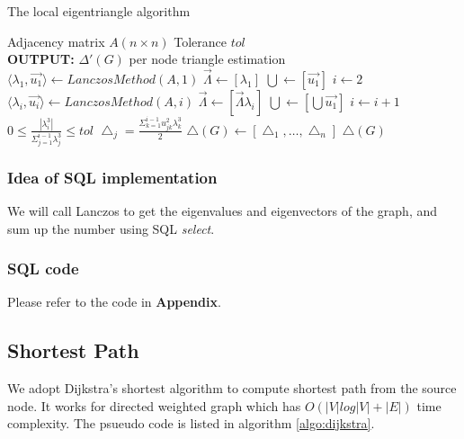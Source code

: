 \begin{algorithm}[!htbf]
\caption{The local eigentriangle algorithm\cite{tsourakakis2008fast}}
\begin{algorithmic}
\REQUIRE Adjacency matrix $A(n \times n)$
\REQUIRE Tolerance $tol$\\
{\bf OUTPUT: } $\Delta'(G)$  per node triangle estimation
\STATE $\langle \lambda_{1},\vec{u_{1}} \rangle \leftarrow LanczosMethod(A,1)$
\STATE $\vec{\Lambda} \leftarrow [\lambda_{1}]$
\STATE $\bigcup \leftarrow [\vec{u_{1}}]$
\STATE $i \leftarrow 2$
\REPEAT
\STATE $\langle \lambda_{i},\vec{u_{i}} \rangle \leftarrow LanczosMethod(A,i)$
\STATE $\vec{\Lambda} \leftarrow [\vec{\Lambda}\lambda_{i}]$
\STATE $\bigcup \leftarrow [\bigcup \vec{u_{1}}]$
\STATE $i \leftarrow i + 1$
\UNTIL $0 \leq \frac{|\lambda_{i}^3|}{\Sigma_{j=1}^{i-1}\lambda_{j}^3} \leq tol$
\STATE $\bigtriangleup_{j} = \frac{\Sigma_{k=1}^{i-1}u_{jk}^2\lambda_{k}^3}{2}$
\ENDFOR
\STATE $\bigtriangleup(G)\leftarrow[\bigtriangleup_{1},\ldots,\bigtriangleup_{n}]$
\RETURN $\bigtriangleup(G)$
\end{algorithmic}
\end{algorithm}




\subsubsection{Idea of SQL implementation}
We will call Lanczos to get the eigenvalues and eigenvectors of the graph, and sum up the number using SQL \emph{select}.

\subsubsection{SQL code}
Please refer to the code in {\bf Appendix}.

\subsection{Shortest Path}
We adopt Dijkstra's shortest algorithm to compute shortest path from the source node. It works for directed weighted
graph which has $O(|V| log |V| + |E|)$ time complexity. The psueudo code is listed in algorithm \ref{algo:dijkstra}.


